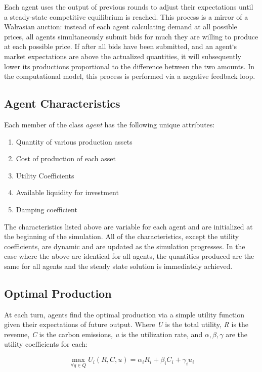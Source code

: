 \documentclass{article}
\begin{document}
Each agent uses the output of previous rounds to adjust their expectations until a steady-state competitive equilibrium is reached. This process is a mirror of a Walrasian auction: instead of each agent calculating demand at all possible prices, all agents simultaneously submit bids for much they are willing to produce at each possible price. If after all bids have been submitted, and an agent`s market expectations are above the actualized quantities, it will subsequently lower its productions proportional to the difference between the two amounts. In the computational model, this process is performed via a negative feedback loop.

\subsection{Agent Characteristics}
Each member of the class \emph{agent} has the following unique attributes: 

	\begin{enumerate}
		\item Quantity of various production assets 
		\item Cost of production of each asset
		\item Utility Coefficients
		\item Available liquidity for investment
		\item Damping coefficient
	\end{enumerate} 

The characteristics listed above are variable for each agent and are initialized at the beginning of the simulation. All of the characteristics, except the utility coefficients, are dynamic and are updated as the simulation progresses. In the case where the above are identical for all agents, the quantities produced are the same for all agents and the steady state solution is immediately achieved.


\subsection{Optimal Production}
At each turn, agents find the optimal production via a simple utility function given their expectations of future output. Where \emph{U} is the total utility, \emph{R} is the revenue, \emph{C} is the carbon emissions, \emph{u} is the utilization rate, and $\alpha, \beta, \gamma $ are the utility coefficients for each:

	\begin{equation}
		\max_{\forall q \in Q} U_i(R, C, u) = \alpha_{i} R_{i} + \beta_{i} C_{i} + \gamma_{i} u_{i}
	\end{equation}
\end{document}
